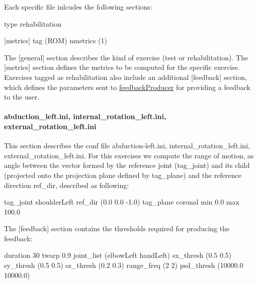 Each specific file inlcudes the following sections\+:


\begin{DoxyCode}
[general]
type                           rehabilitation

[metrics]
tag                            (ROM)
nmetrics                       (1)
\end{DoxyCode}


The {\ttfamily \mbox{[}general\mbox{]}} section describes the kind of exercise (test or rehabilitation). The {\ttfamily \mbox{[}metrics\mbox{]}} section defines the metrics to be computed for the specific exercise. Exercises tagged as {\ttfamily rehabilitation} also include an additional {\ttfamily \mbox{[}feedback\mbox{]}} section, which defines the parameters sent to \hyperlink{group__feedbackProducer}{feedback\+Producer} for providing a feedback to the user.\hypertarget{group__motionAnalyzer_sec-abduction}{}\paragraph{abduction\+\_\+left.\+ini, internal\+\_\+rotation\+\_\+left.\+ini, external\+\_\+rotation\+\_\+left.\+ini}\label{group__motionAnalyzer_sec-abduction}
This section describes the conf file abduction-\/left.\+ini, internal\+\_\+rotation\+\_\+left.\+ini, external\+\_\+rotation\+\_\+left.\+ini. For this exercises we compute the range of motion, as angle between the vector formed by the reference joint ({\ttfamily tag\+\_\+joint}) and its child (projected onto the projection plane defined by {\ttfamily tag\+\_\+plane}) and the reference direction {\ttfamily ref\+\_\+dir}, described as following\+:


\begin{DoxyCode}
[ROM\_0]
tag\_joint                      shoulderLeft
ref\_dir                        (0.0 0.0 -1.0)
tag\_plane                      coronal
min                            0.0
max                            100.0
\end{DoxyCode}


The {\ttfamily \mbox{[}feedback\mbox{]}} section contains the thresholds required for producing the feedback\+:


\begin{DoxyCode}
[feedback]
duration                       30
twarp                          0.9
joint\_list                     (elbowLeft handLeft)
sx\_thresh                      (0.5 0.5)
sy\_thresh                      (0.5 0.5)
sz\_thresh                      (0.2 0.3)
range\_freq                     (2 2)
psd\_thresh                     (10000.0 10000.0)
\end{DoxyCode}


